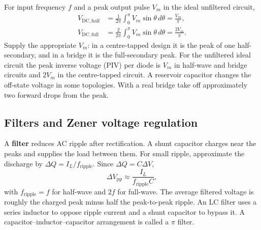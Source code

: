 \documentclass[12pt,a4paper]{article}
\begin{document}
\begin{tcolorbox}[tikzbox,title={Ideal unfiltered output waveforms},unbreakable]
\centering
{}
\end{tcolorbox}

For input frequency \(f\) and a peak output pulse \(V_m\) in the ideal unfiltered circuit,
\[
\begin{aligned}
V_{\mathrm{DC,half}}
 &=\frac{1}{2\pi}\int_0^\pi V_m\sin\theta\,d\theta
 =\frac{V_m}{\pi},\\
V_{\mathrm{DC,full}}
 &=\frac{2}{2\pi}\int_0^\pi V_m\sin\theta\,d\theta
 =\frac{2V_m}{\pi}.
\end{aligned}
\]
Supply the appropriate \(V_m\): in a centre-tapped design it is the peak of one half-secondary, and in a bridge it is the full-secondary peak. For the unfiltered ideal circuit the peak inverse voltage (PIV) per diode is \(V_m\) in half-wave and bridge circuits and \(2V_m\) in the centre-tapped circuit. A reservoir capacitor changes the off-state voltage in some topologies. With a real bridge take off approximately two forward drops from the peak.

\subsection{Filters and Zener voltage regulation}
A \textbf{filter} reduces AC ripple after rectification. A shunt capacitor charges near the peaks and supplies the load between them. For small ripple, approximate the discharge by \(\Delta Q=I_L/f_{\mathrm{ripple}}\). Since \(\Delta Q=C\Delta V\),
\[
\Delta V_{\mathrm{pp}}\approx\frac{I_L}{f_{\mathrm{ripple}}C},
\]
with \(f_{\mathrm{ripple}}=f\) for half-wave and \(2f\) for full-wave. The average filtered voltage is roughly the charged peak minus half the peak-to-peak ripple. An LC filter uses a series inductor to oppose ripple current and a shunt capacitor to bypass it. A capacitor--inductor--capacitor arrangement is called a \(\pi\) filter.
\end{document}
